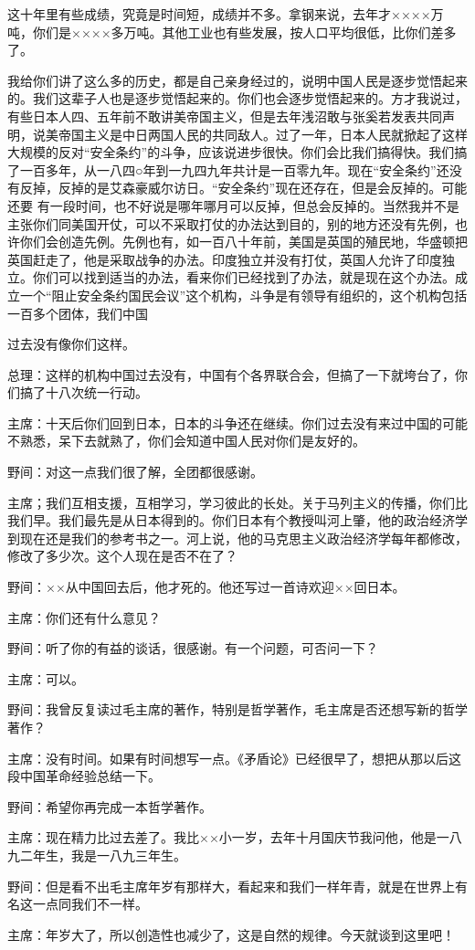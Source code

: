 这十年里有些成绩，究竟是时间短，成绩并不多。拿钢来说，去年才××××万吨，你们是××××多万吨。其他工业也有些发展，按人口平均很低，比你们差多了。

我给你们讲了这么多的历史，都是自己亲身经过的，说明中国人民是逐步觉悟起来的。我们这辈子人也是逐步觉悟起来的。你们也会逐步觉悟起来的。方才我说过，有些日本人四、五年前不敢讲美帝国主义，但是去年浅沼敢与张奚若发表共同声明，说美帝国主义是中日两国人民的共同敌人。过了一年，日本人民就掀起了这样大规模的反对“安全条约”的斗争，应该说进步很快。你们会比我们搞得快。我们搞了一百多年，从一八四○年到一九四九年共计是一百零九年。现在“安全条约”还没有反掉，反掉的是艾森豪威尔访日。“安全条约”现在还存在，但是会反掉的。可能还要
有一段时间，也不好说是哪年哪月可以反掉，但总会反掉的。当然我并不是主张你们同美国开仗，可以不采取打仗的办法达到目的，别的地方还没有先例，也许你们会创造先例。先例也有，如一百八十年前，美国是英国的殖民地，华盛顿把英国赶走了，他是采取战争的办法。印度独立并没有打仗，英国人允许了印度独立。你们可以找到适当的办法，看来你们已经找到了办法，就是现在这个办法。成立一个“阻止安全条约国民会议”这个机构，斗争是有领导有组织的，这个机构包括一百多个团体，我们中国

过去没有像你们这样。

总理：这样的机构中国过去没有，中国有个各界联合会，但搞了一下就垮台了，你们搞了十八次统一行动。

主席：十天后你们回到日本，日本的斗争还在继续。你们过去没有来过中国的可能不熟悉，呆下去就熟了，你们会知道中国人民对你们是友好的。

野间：对这一点我们很了解，全团都很感谢。

主席；我们互相支援，互相学习，学习彼此的长处。关于马列主义的传播，你们比我们早。我们最先是从日本得到的。你们日本有个教授叫河上肇，他的政治经济学到现在还是我们的参考书之一。河上说，他的马克思主义政治经济学每年都修改，修改了多少次。这个人现在是否不在了？

野间：××从中国回去后，他才死的。他还写过一首诗欢迎××回日本。

主席：你们还有什么意见？

野间：听了你的有益的谈话，很感谢。有一个问题，可否问一下？

主席：可以。

野间：我曾反复读过毛主席的著作，特别是哲学著作，毛主席是否还想写新的哲学著作？

主席：没有时间。如果有时间想写一点。《矛盾论》已经很早了，想把从那以后这段中国革命经验总结一下。

野间：希望你再完成一本哲学著作。

主席：现在精力比过去差了。我比××小一岁，去年十月国庆节我问他，他是一八九二年生，我是一八九三年生。

野间：但是看不出毛主席年岁有那样大，看起来和我们一样年青，就是在世界上有名这一点同我们不一样。

主席：年岁大了，所以创造性也减少了，这是自然的规律。今天就谈到这里吧！


